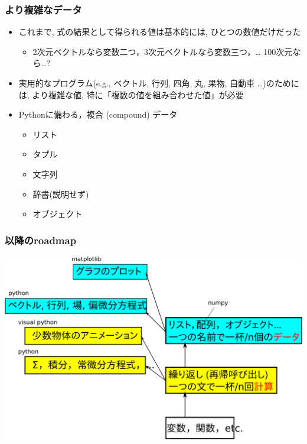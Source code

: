 \documentclass[10pt,dvipdfmx]{beamer}
\begin{document}
\begin{frame}[fragile]
\frametitle{より複雑なデータ}
\begin{itemize}
\item これまで, 式の結果として得られる値は基本的には,
ひとつの数値だけだった
\begin{itemize}
\item 2次元ベクトルなら変数二つ，3次元ベクトルなら変数三つ，\ldots
100次元なら\ldots ?
\end{itemize}

\item 実用的なプログラム(e.g., ベクトル, 行列, 四角, 丸, 果物,
自動車 \ldots)のためには, より複雑な値, 
特に「複数の値を組み合わせた値」が必要

\item Pythonに備わる，複合 (compound) データ
\begin{itemize}
\item リスト
\item タプル
\item 文字列
\item 辞書(説明せず)
\item オブジェクト
\end{itemize}
\end{itemize}

\end{frame}


\begin{frame}
\frametitle{以降のroadmap}

\begin{center}
\includegraphics[width=1.0\textwidth]{out/pdf/svg/roadmap.pdf}
\end{center}

\end{frame}
\end{document}
